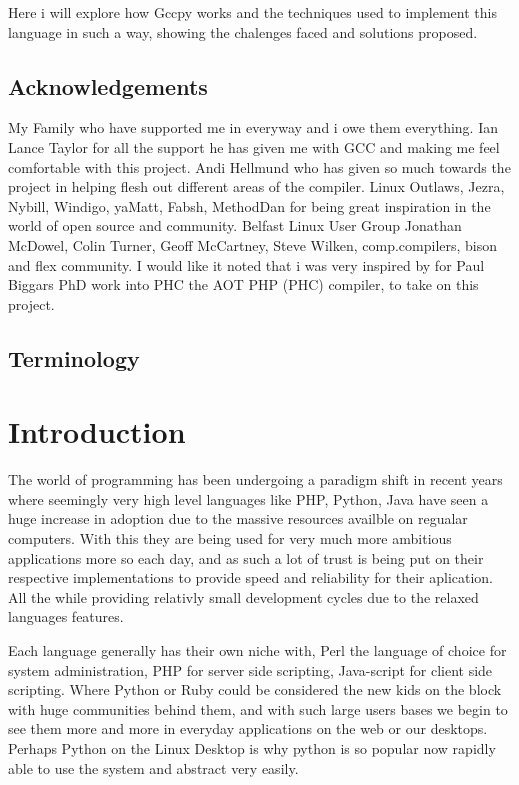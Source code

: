 \documentclass[defaultstyle,11pt]{article}
\begin{document}
Here i will explore how Gccpy works and the techniques used to implement this language in such a way,
showing the chalenges faced and solutions proposed.

\subsection{Acknowledgements}
My Family who have supported me in everyway and i owe them everything. Ian Lance Taylor for all the support
he has given me with GCC and making me feel comfortable with this project. Andi Hellmund who
has given so much towards the project in helping flesh out different areas of the compiler.
Linux Outlaws, Jezra, Nybill, Windigo, yaMatt, Fabsh, MethodDan for being great inspiration in the world
of open source and community. Belfast Linux User Group Jonathan McDowel,
Colin Turner, Geoff McCartney, Steve Wilken, comp.compilers, bison and flex community. 
I would like it noted that i was very inspired by for Paul Biggars PhD work into PHC the AOT PHP (PHC) compiler,
to take on this project.

\subsection{Terminology}

\section{Introduction}

The world of programming has been undergoing a paradigm shift in recent years where seemingly very high level
languages like PHP, Python, Java have seen a huge increase in adoption due to the massive resources availble on
regualar computers. With this they are being used for very much more ambitious applications more so each day,
and as such a lot of trust is being put on their respective implementations to provide speed and reliability for
their aplication. All the while providing relativly small development cycles due to the relaxed languages features.

Each language generally has their own niche with, Perl the language of choice for system administration,
PHP for server side scripting, Java-script for client side scripting. Where Python or Ruby could be considered
the new kids on the block with huge communities behind them, and with such large users bases we begin to see
them more and more in everyday applications on the web or our desktops. Perhaps Python on the Linux Desktop
is why python is so popular now rapidly able to use the system and abstract very easily.
\end{document}
